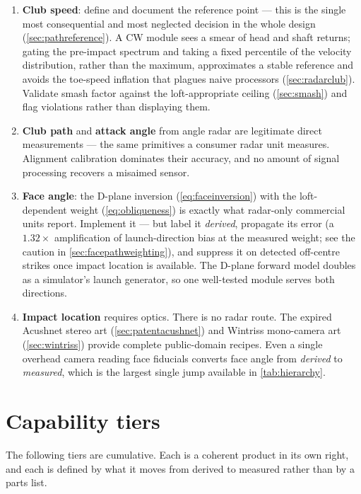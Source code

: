 \begin{enumerate}
\item \textbf{Club speed}: define and document the reference point --- this
is the single most consequential and most neglected decision in the whole
design (\cref{sec:pathreference}). A CW module sees a smear of head and
shaft returns; gating the pre-impact spectrum and taking a fixed percentile
of the velocity distribution, rather than the maximum, approximates a stable
reference and avoids the toe-speed inflation that plagues naive processors
(\cref{sec:radarclub}). Validate smash factor against the loft-appropriate
ceiling (\cref{sec:smash}) and flag violations rather than displaying them.
\item \textbf{Club path} and \textbf{attack angle} from angle radar are
legitimate direct measurements --- the same primitives a consumer radar unit
measures. Alignment calibration dominates their accuracy, and no amount of
signal processing recovers a misaimed sensor.
\item \textbf{Face angle}: the D-plane inversion (\cref{eq:faceinversion})
with the loft-dependent weight (\cref{eq:obliqueness}) is exactly what
radar-only commercial units report. Implement it --- but label it
\emph{derived}, propagate its error (a $1.32\times$ amplification of
launch-direction bias at the measured weight; see the caution in
\cref{sec:facepathweighting}), and suppress it on detected off-centre
strikes once impact location is available. The D-plane forward model doubles
as a simulator's launch generator, so one well-tested module serves both
directions.
\item \textbf{Impact location} requires optics. There is no radar route.
The expired Acushnet stereo art (\cref{sec:patentacushnet}) and Wintriss
mono-camera art (\cref{sec:wintriss}) provide complete public-domain
recipes. Even a single overhead camera reading face fiducials converts face
angle from \emph{derived} to \emph{measured}, which is the largest single
jump available in \cref{tab:hierarchy}.
\end{enumerate}

\section{Capability tiers}

The following tiers are cumulative. Each is a coherent product in its own
right, and each is defined by what it moves from derived to measured rather
than by a parts list.

